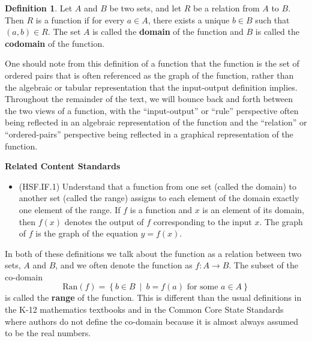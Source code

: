 \documentclass[
]{book}
\providecommand{\tightlist}{%
  \setlength{\itemsep}{0pt}\setlength{\parskip}{0pt}}
\newenvironment{standards}{}{}
\theoremstyle{definition}
\newtheorem{definition}{Definition}[chapter]
\theoremstyle{definition}
\theoremstyle{definition}
\theoremstyle{definition}
\theoremstyle{remark}
\begin{document}
\begin{definition}
Let \(A\) and \(B\) be two sets, and let \(R\) be a relation from \(A\) to \(B\). Then \(R\) is a function if for every \(a\in A\), there exists a unique \(b\in B\) such that \((a,b)\in R\). The set \(A\) is called the \textbf{domain} of the function and \(B\) is called the \textbf{codomain} of the function.
\end{definition}

One should note from this definition of a function that the function is the set of ordered pairs that is often referenced as the graph of the function, rather than the algebraic or tabular representation that the input-output definition implies. Throughout the remainder of the text, we will bounce back and forth between the two views of a function, with the ``input-output'' or ``rule'' perspective often being reflected in an algebraic representation of the function and the ``relation'' or ``ordered-pairs'' perspective being reflected in a graphical representation of the function.

\begin{standards}

\begin{center}
\textbf{Related Content Standards}

\end{center}

\begin{itemize}
\tightlist
\item
  (HSF.IF.1) Understand that a function from one set (called the domain) to another set (called the range) assigns to each element of the domain exactly one element of the range. If \(f\) is a function and \(x\) is an element of its domain, then \(f(x)\) denotes the output of \(f\) corresponding to the input \(x\). The graph of \(f\) is the graph of the equation \(y = f(x)\).\\
\end{itemize}

\end{standards}

In both of these definitions we talk about the function as a relation between two sets, \(A\) and \(B\), and we often denote the function as \(f:A \rightarrow B\). The subset of the co-domain \[\mbox{Ran}(f)=\left\{b\in B \: \middle \vert  \: b=f(a) \mbox{ for some } a \in A\right\}\] is called the \textbf{range} of the function. This is different than the usual definitions in the K-12 mathematics textbooks and in the Common Core State Standards where authors do not define the co-domain because it is almost always assumed to be the real numbers.
\end{document}
